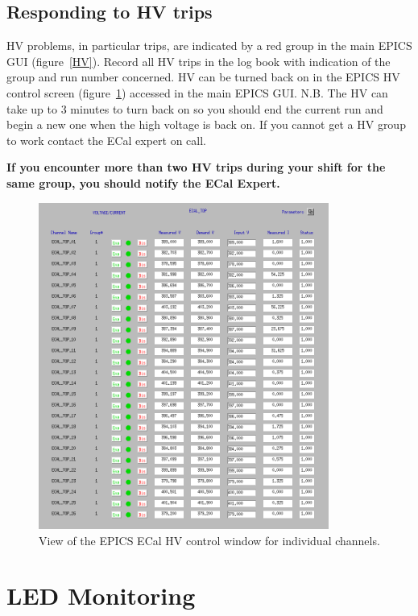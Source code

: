 \documentclass[12pt]{article}
\begin{document}
   \subsection{Responding to HV trips}

      HV problems, in particular trips, are indicated by a red group in the main EPICS GUI (figure~\ref{HV}). Record all HV trips in the log book with indication of the group and run number concerned. HV can be turned back on in the EPICS HV control screen (figure~\ref{HVControl}) accessed in the main EPICS GUI. N.B. The HV can take up to 3 minutes to turn back on so you should end the current run and begin a new one when the high voltage is back on. If you cannot get a HV group to work contact the ECal expert on call.

      {\bf If you encounter more than two HV trips during your shift for the same group, you should notify the ECal Expert.}

\begin{figure}[htbp]
\center
\includegraphics[width=0.85\textwidth]{pics/ecalhv_setting_2014_12_15.png}
\caption{\small \label{HVControl} View of the EPICS ECal HV control window for individual channels.}
\end{figure}

   \section{LED Monitoring}
\end{document}
